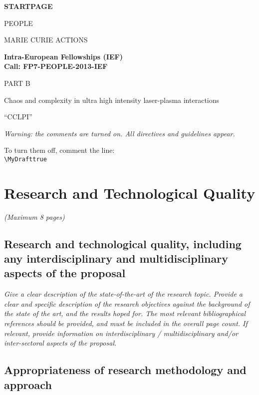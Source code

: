\documentclass[a4paper,11pt]{article}
\title{\mytitle}
\newif\ifMyDraft%
\newcommand{\projectname}[0]{CCLPI}
\newcommand{\mytitle}{Chaos and complexity in ultra high intensity laser-plasma interactions}
\newenvironment{xcomment}{\em}{}
\newcommand{\cover}[1]{%
\newpage
\begin{center}
\vspace{4cm}
\textbf{#1}
\vspace{4cm}

PEOPLE

MARIE CURIE ACTIONS

\vspace{1cm}

\textbf{Intra-European Fellowships (IEF)}\\
\textbf{Call: FP7-PEOPLE-2013-IEF}

\vspace{4cm}

\Large{PART B}
\vspace{2cm}

\Huge{\mytitle}

\vspace{1cm}

\Large{``\projectname''}

\end{center}
\newpage
}
\begin{document}
\cover{STARTPAGE}

\newpage

\begin{xcomment} 
Warning: the comments are turned on. All directives and guidelines appear.

To turn them off, comment the line:\\ 
\verb|\MyDrafttrue|\\

\end{xcomment} 


\section{Research and Technological Quality}

\begin{xcomment}  
(Maximum 8 pages)  
\end{xcomment}

\subsection{Research and technological quality, including any interdisciplinary and multidisciplinary aspects of the proposal}

\begin{xcomment}
Give a clear description of the state-of-the-art of the research topic. Provide a clear and specific
description of the research objectives against the background of the state of the art, and the
results hoped for. The most relevant bibliographical references should be provided, and must be
included in the overall page count. If relevant, provide information on interdisciplinary /
multidisciplinary and/or inter-sectoral aspects of the proposal.
\end{xcomment}

\subsection{Appropriateness of research methodology and approach}
\end{document}
